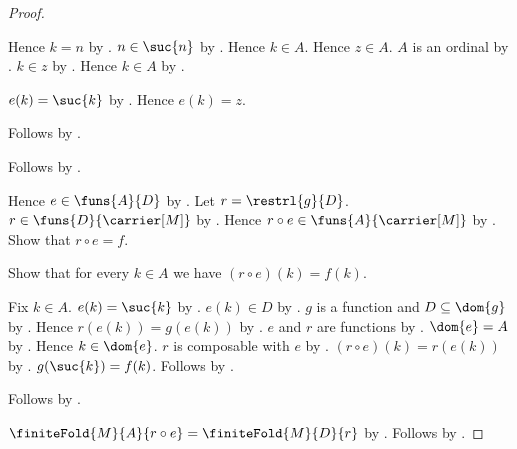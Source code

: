 \begin{proof}
\begin{subproof}
\begin{subproof}
\begin{subproof}
\begin{subproof}
\begin{byCase}
                            Hence $k=n$ by .
                            $n\in\suc{n}$ by .
                            Hence $k\in A$.
                            Hence $z\in A$.
                            $A$ is an ordinal by
                                .
                            $k\in z$ by .
                            Hence $k\in A$ by
                                .
                    \end{byCase}
                \end{subproof}
                $e(k)=\suc{k}$ by
                    .
                Hence $e(k)=z$.
            \end{subproof}
            Follows by .
        \end{subproof}
        Follows by .
    \end{subproof}

    Hence $e\in\funs{A}{D}$ by .
    Let $r=\restrl{g}{D}$.
    $r\in\funs{D}{\carrier[M]}$ by
        .
    Hence $r\circ e\in\funs{A}{\carrier[M]}$ by
        .
    Show that $r\circ e=f$.
    \begin{subproof}
        Show that for every $k\in A$ we have
            $(r\circ e)(k)=f(k)$.
        \begin{subproof}
            Fix $k\in A$.
            $e(k)=\suc{k}$ by
                .
            $e(k)\in D$ by .
            $g$ is a function and $D\subseteq\dom{g}$ by
                .
            Hence $r(e(k))=g(e(k))$ by
                .
            $e$ and $r$ are functions by
                .
            $\dom{e}=A$ by .
            Hence $k\in\dom{e}$.
            $r$ is composable with $e$ by
                .
            $(r\circ e)(k)=r(e(k))$ by .
            $g(\suc{k})=f(k)$.
            Follows by \auto.
        \end{subproof}
        Follows by
            .
    \end{subproof}
    $\finiteFold{M}{A}{r\circ e}
        =\finiteFold{M}{D}{r}$ by
        .
    Follows by \auto.
\end{proof}

